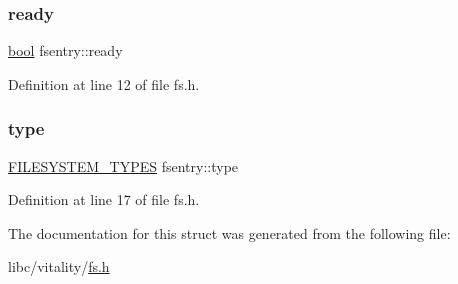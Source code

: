 \mbox{\label{a00262_a284522ed97fe1eeebd0fcc039b2ea00a_a284522ed97fe1eeebd0fcc039b2ea00a}} 
\subsubsection{\texorpdfstring{ready}{ready}}
{\footnotesize\ttfamily \hyperlink{a00134_af6a258d8f3ee5206d682d799316314b1_af6a258d8f3ee5206d682d799316314b1}{bool} fsentry\+::ready}



Definition at line 12 of file fs.\+h.

\mbox{\label{a00262_acbab3dd44174c8f74e1d9305a13c7dbb_acbab3dd44174c8f74e1d9305a13c7dbb}} 
\subsubsection{\texorpdfstring{type}{type}}
{\footnotesize\ttfamily \hyperlink{a00155_a2e9d0c3765a28910638672bfc746181b_a2e9d0c3765a28910638672bfc746181b}{F\+I\+L\+E\+S\+Y\+S\+T\+E\+M\+\_\+\+T\+Y\+P\+ES} fsentry\+::type}



Definition at line 17 of file fs.\+h.



The documentation for this struct was generated from the following file\+:\begin{DoxyCompactItemize}
\item 
libc/vitality/\hyperlink{a00146}{fs.\+h}\end{DoxyCompactItemize}
